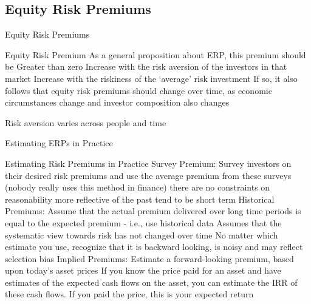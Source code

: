\documentclass[10pt]{article}
\begin{document}
  \subsection{Equity Risk Premiums}

    \begin{core}{Equity Risk Premiums}

      Equity Risk Premium
      As a general proposition about ERP, this premium should be
      Greater than zero
      Increase with the risk aversion of the investors in that market
      Increase with the riskiness of the ‘average’ risk investment
      If so, it also follows that equity risk premiums should change over time, as economic circumstances change and investor composition also changes

      Risk aversion varies across people and time

    \end{core}

    \begin{core}{Estimating ERPs in Practice}

      Estimating Risk Premiums in Practice
      Survey Premium: Survey investors on their desired risk premiums and use the average premium from these surveys (nobody really uses this method in finance)
      there are no constraints on reasonability
      more reflective of the past
      tend to be short term
      Historical Premiums: Assume that the actual premium delivered over long time periods is equal to the expected premium - i.e., use historical data
      Assumes that the systematic view towards risk has not changed over time
      No matter which estimate you use, recognize that it is backward looking, is noisy and may reflect selection bias
      Implied Premiums: Estimate a forward-looking premium, based upon today’s asset prices
      If you know the price paid for an asset and have estimates of the expected cash flows on the asset, you can estimate the IRR of these cash flows. If you paid the price, this is your expected return

    \end{core}
\end{document}
